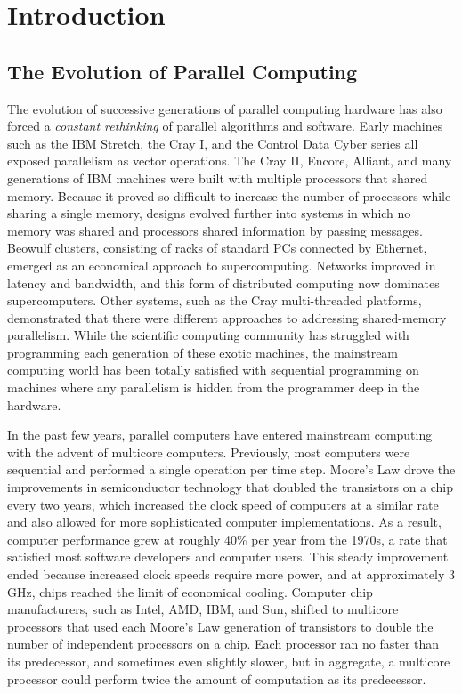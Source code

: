 \documentclass[twocolumn]{article}
\begin{document}
\section{Introduction}
\subsection{The Evolution of Parallel Computing}
The evolution of successive generations of parallel computing
hardware has also forced a \emph{constant rethinking} of parallel algorithms
and software. Early machines such as the IBM Stretch, the
Cray I, and the Control Data Cyber series all exposed parallelism
as vector operations. The Cray II, Encore, Alliant, and many generations
of IBM machines were built with multiple processors that
shared memory. Because it proved so difficult to increase the number of processors
while sharing a single memory, designs evolved further into systems in which
no memory was shared and processors shared information by passing messages.
Beowulf clusters, consisting of racks of standard PCs connected by Ethernet,
emerged as an economical approach to supercomputing. Networks improved in
latency and bandwidth, and this form of distributed computing now dominates supercomputers.
Other systems, such as the Cray multi-threaded platforms, demonstrated
that there were different approaches to addressing shared-memory parallelism.
While the scientific computing community has struggled with programming
each generation of these exotic machines, the mainstream computing world has
been totally satisfied with sequential programming on machines where any parallelism
is hidden from the programmer deep in the hardware.

In the past few years, parallel computers have entered mainstream computing
with the advent of multicore computers. Previously, most computers were sequential
and performed a single operation per time step. Moore’s Law drove the improvements
in semiconductor technology that doubled the transistors on a chip
every two years, which increased the clock speed of computers at a similar rate
and also allowed for more sophisticated computer implementations. As a result,
computer performance grew at roughly 40\% per year from the 1970s, a rate that
satisfied most software developers and computer users. This steady improvement
ended because increased clock speeds require more power, and at approximately
3 GHz, chips reached the limit of economical cooling. Computer chip manufacturers,
such as Intel, AMD, IBM, and Sun, shifted to multicore processors that used
each Moore’s Law generation of transistors to double the number of independent
processors on a chip. Each processor ran no faster than its predecessor, and sometimes
even slightly slower, but in aggregate, a multicore processor could perform
twice the amount of computation as its predecessor.
\end{document}
